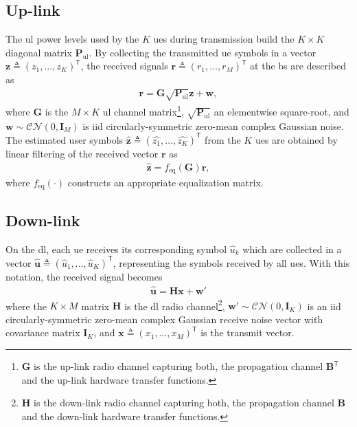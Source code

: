 \documentclass[journal]{IEEEtran}
\begin{document}
\subsection{Up-link}
%
The \gls{ul} power levels used by the $K$ \glspl{ue} during transmission build the $K \times K$ diagonal matrix $\bm{P}_\mathrm{ul}$. By collecting the transmitted \gls{ue} symbols in a vector $\bm{z} \triangleq (z_1,\ldots,z_K)^\mathsf{T}$, the received signals $\bm{r} \triangleq (r_1,\ldots,r_M)^\mathsf{T}$ at the \gls{bs} are described as
\begin{align}\label{eq:ul_model}
    \bm{r} = \bm{G}\sqrt{\bm{P}_\mathrm{ul}}\bm{z} + \bm{w},
\end{align}
where $\bm{G}$ is the $M\times K$ \gls{ul} channel matrix\footnote{$\bm{G}$ is the up-link radio channel capturing both, the propagation channel $\bm{B}^\mathsf{T}$ and the up-link hardware transfer functions.}, $\sqrt{\bm{P}_\mathrm{ul}}$ an elementwise square-root, and $\bm{w} \sim  \mathcal{CN}(0,\mathbf{I}_M)$ is \gls{iid} circularly-symmetric zero-mean complex Gaussian noise.  
The estimated user symbols $\widehat{\bm{z}} \triangleq (\hat{z_1},\ldots,\hat{z_K})^\mathsf{T}$ from the $K$ \glspl{ue} are obtained by linear filtering of the received vector $\bm{r}$ as
\begin{align}
\label{eq:Detector}
    \widehat{\bm{z}} = f_\text{eq}(\bm{G})\bm{r},
\end{align}
where  $f_\text{eq}( \cdot )$ constructs an appropriate equalization matrix.

%
%
%
%
%



\subsection{Down-link}
On the \gls{dl}, each \gls{ue} receives its corresponding symbol $\hat{u}_k$ which are collected in a vector $\widehat{\bm{u}} \triangleq  (\hat{u}_1, \ldots ,\hat{u}_K)^\mathsf{T}$, representing the symbols received by all \glspl{ue}. With this notation, the received signal becomes
%
%
%
\begin{align}
\label{eq:DLchannel}
\widehat{\bm{u}} = \bm{H}\bm{x} + \bm{w}'
\end{align}
where the $K \times M$ matrix $\bm{H}$ is the \gls{dl} radio channel\footnote{$\bm{H}$ is the down-link radio channel capturing both, the propagation channel $\bm{B}$ and the down-link hardware transfer functions.},  $\bm{w}' \sim  \mathcal{CN}(0,\mathbf{I}_K)$ is an \gls{iid} circularly-symmetric zero-mean complex Gaussian receive noise vector with covariance matrix $\mathbf{I}_K$, and ${\bm{x} \triangleq  (x_1, \ldots , x_M)^\mathsf{T}}$ is the transmit vector. 
\end{document}
